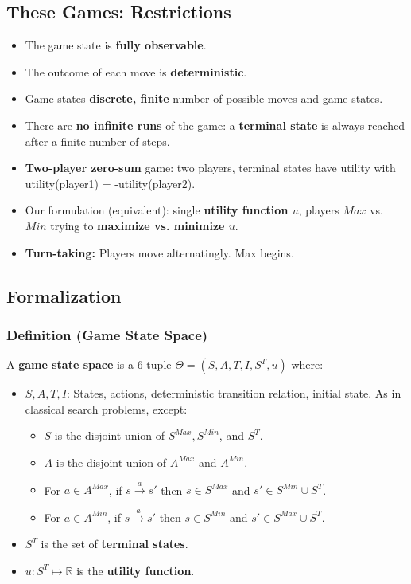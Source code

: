 \documentclass[conference]{styles/acmsiggraph}
\begin{document}
    \subsection{These Games: Restrictions}
        \begin{itemize}
            \item The game state is \textbf{fully observable}.
            \item The outcome of each move is \textbf{deterministic}.
            \item Game states \textbf{discrete, finite} number of possible moves and game states.
            \item There are \textbf{no infinite runs} of the game: a \textbf{terminal state} is always reached after a finite number of steps.
            \item \textbf{Two-player zero-sum} game: two players, terminal states have utility with utility(player1) = -utility(player2).
            \item Our formulation (equivalent): single \textbf{utility function $u$}, players $Max$ vs. $Min$ trying to \textbf{maximize vs. minimize $u$}.
            \item \textbf{Turn-taking:} Players move alternatingly. Max begins.
        \end{itemize}
    
    \subsection{Formalization}
        \subsubsection{Definition (Game State Space)}
            A \textbf{game state space} is a 6-tuple $\Theta = (S,A,T,I,S^T,u)$ where:
                \begin{itemize}
                    \item $S,A,T,I$: States, actions, deterministic transition relation, initial state. 
                        As in classical search problems, except:
                            \begin{itemize}
                                \item $S$ is the disjoint union of $S^{Max},S^{Min}$, and $S^T$.
                                \item $A$ is the disjoint union of $A^{Max}$ and $A^{Min}$.
                                \item For $a \in A^{Max}$, if $s \xrightarrow{a} s'$ then $s \in S^{Max}$ and $s' \in S^{Min} \cup S^T$.
                                \item For $a \in A^{Min}$, if $s \xrightarrow{a} s'$ then $s \in S^{Min}$ and $s' \in S^{Max} \cup S^T$.
                            \end{itemize}
                        \item $S^T$ is the set of \textbf{terminal states}.
                        \item $u : S^T \mapsto \mathbb{R}$ is the \textbf{utility function}.
                \end{itemize}
        
\end{document}
